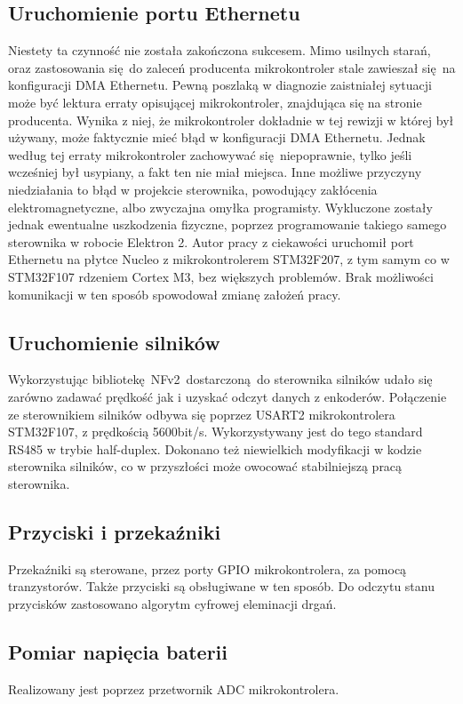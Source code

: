 \documentclass[a4paper, 12pt]{article}
\begin{document}
	\subsection{Uruchomienie portu Ethernetu}
	Niestety ta czynność nie została zakończona sukcesem. Mimo usilnych starań, oraz zastosowania się do zaleceń producenta mikrokontroler stale zawieszał się na konfiguracji DMA Ethernetu. Pewną poszlaką w diagnozie zaistniałej sytuacji może być lektura erraty opisującej mikrokontroler, znajdująca się na stronie producenta. Wynika z niej, że mikrokontroler dokładnie w tej rewizji w której był używany, może faktycznie mieć błąd w konfiguracji DMA Ethernetu. Jednak według tej erraty mikrokontroler zachowywać się niepoprawnie, tylko jeśli wcześniej był usypiany, a fakt ten nie miał miejsca\cite{STMErrata}. Inne możliwe przyczyny niedziałania to błąd w projekcie sterownika, powodujący zakłócenia elektromagnetyczne, albo zwyczajna omyłka programisty. Wykluczone zostały jednak ewentualne uszkodzenia fizyczne, poprzez programowanie takiego samego sterownika w robocie Elektron 2. Autor pracy z ciekawości uruchomił port Ethernetu na płytce Nucleo z mikrokontrolerem STM32F207, z tym samym co w STM32F107 rdzeniem Cortex M3, bez większych problemów. Brak możliwości komunikacji w ten sposób spowodował zmianę założeń pracy.
	\subsection{Uruchomienie silników}
	Wykorzystując bibliotekę NFv2 dostarczoną do sterownika silników udało się zarówno zadawać prędkość jak i uzyskać odczyt danych z enkoderów. Połączenie ze sterownikiem silników odbywa się poprzez USART2 mikrokontrolera STM32F107, z prędkością 5600bit/s. Wykorzystywany jest do tego standard RS485 w trybie half-duplex. Dokonano też niewielkich modyfikacji w kodzie sterownika silników, co w przyszłości może owocować stabilniejszą pracą sterownika.
	\subsection{Przyciski i przekaźniki}
	Przekaźniki są sterowane, przez porty GPIO mikrokontrolera, za pomocą tranzystorów. Także przyciski są obsługiwane w ten sposób. Do odczytu stanu przycisków zastosowano algorytm cyfrowej eleminacji drgań.
	\subsection{Pomiar napięcia baterii}
	Realizowany jest poprzez przetwornik ADC mikrokontrolera.
\end{document}

